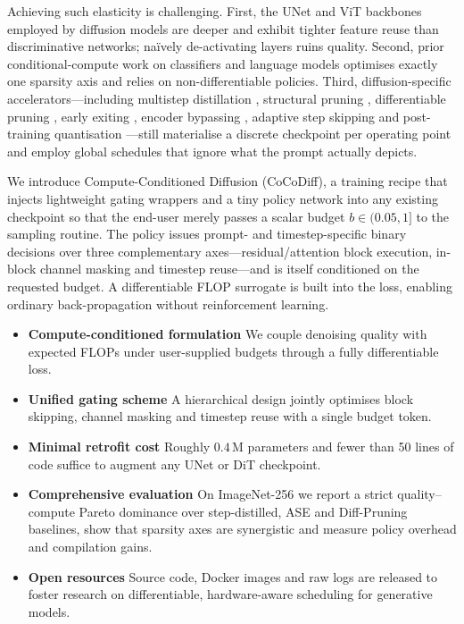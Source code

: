 \documentclass{article} %
\begin{document}
Achieving such elasticity is challenging. First, the UNet and ViT backbones employed by diffusion models are deeper and exhibit tighter feature reuse than discriminative networks; naïvely de-activating layers ruins quality. Second, prior conditional-compute work on classifiers \cite{nowak_2023_fantastic} and language models \cite{author_year_leveraging} optimises exactly one sparsity axis and relies on non-differentiable policies. Third, diffusion-specific accelerators—including multistep distillation \cite{salimans_2024_multistep, gu_2023_data}, structural pruning \cite{fang_2023_structural}, differentiable pruning \cite{zhu_2024_dip}, early exiting \cite{moon_2024_simple}, encoder bypassing \cite{li_2023_faster}, adaptive step skipping \cite{ye_2024_training} and post-training quantisation \cite{shang_2022_post}—still materialise a discrete checkpoint per operating point and employ global schedules that ignore what the prompt actually depicts.

We introduce Compute-Conditioned Diffusion (CoCoDiff), a training recipe that injects lightweight gating wrappers and a tiny policy network into any existing checkpoint so that the end-user merely passes a scalar budget \(b\in(0.05,1]\) to the sampling routine. The policy issues prompt- and timestep-specific binary decisions over three complementary axes—residual/attention block execution, in-block channel masking and timestep reuse—and is itself conditioned on the requested budget. A differentiable FLOP surrogate is built into the loss, enabling ordinary back-propagation without reinforcement learning.

\begin{itemize}
\item \textbf{Compute-conditioned formulation} We couple denoising quality with expected FLOPs under user-supplied budgets through a fully differentiable loss.
\item \textbf{Unified gating scheme} A hierarchical design jointly optimises block skipping, channel masking and timestep reuse with a single budget token.
\item \textbf{Minimal retrofit cost} Roughly \(0.4\,\mathrm{M}\) parameters and fewer than 50 lines of code suffice to augment any UNet or DiT checkpoint.
\item \textbf{Comprehensive evaluation} On ImageNet-256 we report a strict quality–compute Pareto dominance over step-distilled, ASE and Diff-Pruning baselines, show that sparsity axes are synergistic and measure policy overhead and compilation gains.
\item \textbf{Open resources} Source code, Docker images and raw logs are released to foster research on differentiable, hardware-aware scheduling for generative models.
\end{itemize}
\end{document}
